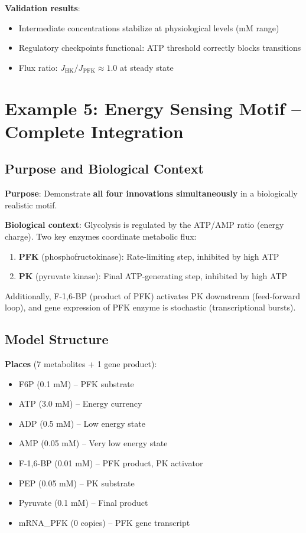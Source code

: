 \textbf{Validation results}:

\begin{itemize}
    \item Intermediate concentrations stabilize at physiological levels (mM range)
    \item Regulatory checkpoints functional: ATP threshold correctly blocks transitions
    \item Flux ratio: $J_{\text{HK}}/J_{\text{PFK}} \approx 1.0$ at steady state
\end{itemize}

\section{Example 5: Energy Sensing Motif -- Complete Integration}
\label{sec:example-energy-sensing}

\subsection{Purpose and Biological Context}
\label{subsec:energy-purpose}

\textbf{Purpose}: Demonstrate \textbf{all four innovations simultaneously} in a biologically realistic motif.

\textbf{Biological context}: Glycolysis is regulated by the ATP/AMP ratio (energy charge). Two key enzymes coordinate metabolic flux:

\begin{enumerate}
    \item \textbf{PFK} (phosphofructokinase): Rate-limiting step, inhibited by high ATP
    \item \textbf{PK} (pyruvate kinase): Final ATP-generating step, inhibited by high ATP
\end{enumerate}

Additionally, F-1,6-BP (product of PFK) activates PK downstream (feed-forward loop), and gene expression of PFK enzyme is stochastic (transcriptional bursts).

\subsection{Model Structure}
\label{subsec:energy-structure}

\textbf{Places} (7 metabolites + 1 gene product):

\begin{itemize}
    \item F6P (0.1 mM) -- PFK substrate
    \item ATP (3.0 mM) -- Energy currency
    \item ADP (0.5 mM) -- Low energy state
    \item AMP (0.05 mM) -- Very low energy state
    \item F-1,6-BP (0.01 mM) -- PFK product, PK activator
    \item PEP (0.05 mM) -- PK substrate
    \item Pyruvate (0.1 mM) -- Final product
    \item mRNA\_PFK (0 copies) -- PFK gene transcript
\end{itemize}

